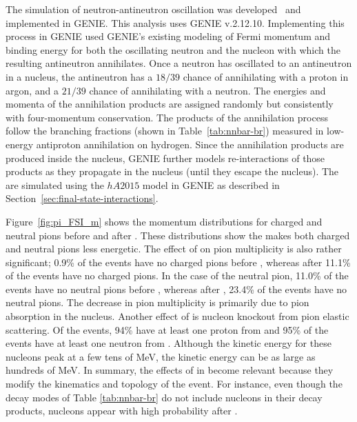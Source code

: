 The simulation of neutron-antineutron oscillation was developed~\cite{Hewes:2017xtr} and implemented in GENIE. This analysis uses GENIE v.2.12.10.
Implementing this process in GENIE used GENIE's existing modeling of Fermi momentum and binding energy for both the oscillating neutron and the nucleon with which the resulting antineutron annihilates.   Once a neutron has oscillated to an antineutron in a nucleus, the antineutron has a $18/39$ chance of annihilating with a proton in argon, and a $21/39$ chance of annihilating with a neutron. The energies and momenta of the annihilation products are assigned randomly but consistently with four-momentum conservation. The products of the annihilation process follow the branching fractions (shown in Table~\ref{tab:nnbar-br}) measured in low-energy antiproton annihilation on hydrogen.
Since the annihilation products are produced inside the nucleus, GENIE further models re-interactions of those products as they propagate in the nucleus (until they escape the nucleus).  The  are simulated using the $hA2015$ model in GENIE as described in Section~\ref{sec:final-state-interactions}.

Figure~\ref{fig:pi_FSI_m} shows the momentum distributions for charged and neutral pions before  and after . These distributions show the  makes both charged and neutral pions less energetic.  The effect of  on pion multiplicity is also rather significant; \num{0.9}\% of the events have no charged pions before , whereas after  \num{11.1}\% of the events have no charged pions. In the case of the neutral pion, \num{11.0}\% of the events have no neutral pions before , whereas after , \num{23.4}\% of the events have no neutral pions. The decrease in pion multiplicity is primarily due to pion absorption in the nucleus. Another effect of  is nucleon knockout from pion elastic scattering. Of the events, \num{94}\% have at least one proton from  and \num{95}\% of the events have at least one neutron from . Although the kinetic energy for these nucleons peak at a few tens of \si{\MeV}, the kinetic energy can be as large as hundreds of \si{\MeV}.  In summary, the effects of  in \nnbar become relevant because they modify the kinematics and topology of the event. For instance, even though the decay modes of Table \ref{tab:nnbar-br} do not include nucleons in their decay products, nucleons appear with high probability after .

